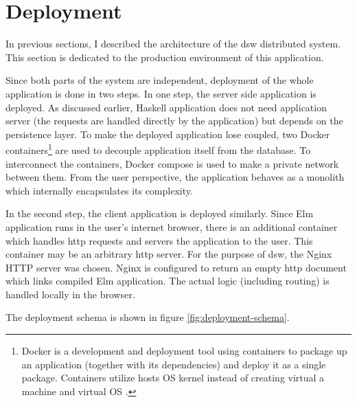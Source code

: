\section{Deployment}

In previous sections, I described the architecture of the \gls{dsw} distributed system.
This section is dedicated to the production environment of this application.

Since both parts of the system are independent, deployment of the whole application is done in two steps.
In one step, the server side application is deployed.
As discussed earlier, Haskell application does not need application server (the requests are handled directly by the application) but depends on the persistence layer.
To make the deployed application lose coupled, two Docker containers\footnote{Docker is a development and deployment tool using containers to package up an application (together with its dependencies) and deploy it as a single package. Containers utilize hosts OS kernel instead of creating virtual a machine and virtual OS \cite{ms-docker}.} are used to decouple application itself from the database.
To interconnect the containers, Docker compose is used to make a private network between them.
From the user perspective, the application behaves as a monolith which internally encapsulates its complexity.

In the second step, the client application is deployed similarly.
Since Elm application runs in the user's internet browser, there is an additional container which handles \gls{http} requests and servers the application to the user.
This container may be an arbitrary \gls{http} server.
For the purpose of \gls{dsw}, the Nginx HTTP server was chosen.
Nginx is configured to return an empty \gls{http} document which links compiled Elm application.
The actual logic (including routing) is handled locally in the browser.

The deployment schema is shown in figure \ref{fig:deployment-schema}.

